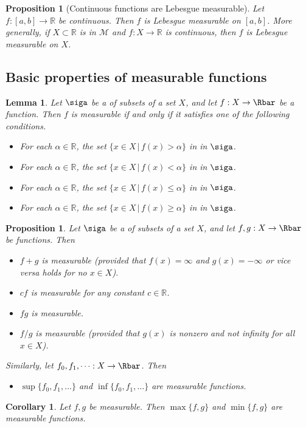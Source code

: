 \documentclass[10pt, oneside, reqno]{amsart}
\theoremstyle{plain}%
\newtheorem{lem}[thm]{Lemma}
\newtheorem{prop}[thm]{Proposition}
\newtheorem*{cor}{Corollary}
\theoremstyle{definition}
\theoremstyle{remark}
\newcommand{\given}{ \, | \,}
\newcommand{\R}{\mathbb{R}}
\begin{document}
\begin{prop}[Continuous functions are Lebesgue measurable]
    Let $f: [a,b] \rightarrow \R$ be continuous.  Then $f$ is Lebesgue measurable on $[a,b]$.  More generally, if $X \subset \R$ is in $\mathcal{M}$ and $f: X \rightarrow \R$ is continuous, then $f$ is Lebesgue measurable on $X$.
\end{prop}

\subsection{Basic properties of measurable functions} %
\label{sub:basic_properties_of_measurable_functions}

\begin{lem}
    Let $\siga$ be a \sig of subsets of a set $X$, and let $f : X \rightarrow \Rbar$ be a function.  Then $f$ is measurable if and only if it satisfies one of the following conditions.
    \begin{itemize}
        \item For each $\alpha \in \R$, the set $\{ x \in X \given f(x) > \alpha \}$ in in $\siga$.
        \item For each $\alpha \in \R$, the set $\{ x \in X \given f(x) < \alpha \}$ in in $\siga$.
        \item For each $\alpha \in \R$, the set $\{ x \in X \given f(x) \leq \alpha \}$ in in $\siga$.
        \item For each $\alpha \in \R$, the set $\{ x \in X \given f(x) \geq \alpha \}$ in in $\siga$.
    \end{itemize}
\end{lem}

\begin{prop}Let $\siga$ be a \sig of subsets of a set $X$, and let $f,g : X \rightarrow \Rbar$ be functions.  Then 
    \begin{itemize}
        \item $f + g$ is measurable (provided that $f(x) = \infty$ and $g(x) = - \infty$ or vice versa holds for no $x \in X$).
        \item $cf$ is measurable for any constant $c \in \R$.
        \item $fg$ is measurable.
        \item $f/g$ is measurable (provided that $g(x)$ is nonzero and not infinity for all $x \in X$).
    \end{itemize}
    
    Similarly, let $f_0,f_1,\dots : X \rightarrow \Rbar$.  Then 
    \begin{itemize}
        \item $\sup\{f_0,f_1,\dots\}$ and $\inf\{f_0,f_1,\dots\}$ are measurable functions.
    \end{itemize}
\end{prop}
\begin{cor}
    Let $f,g$ be measurable.  Then $\max\{f,g\}$ and $\min\{f,g\}$ are measurable functions.
\end{cor}
\end{document}

